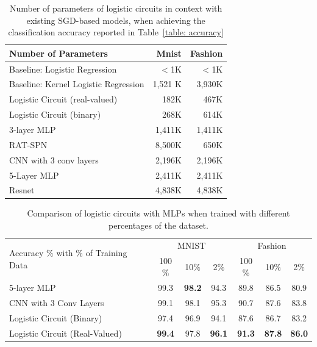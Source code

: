 \documentclass[letterpaper]{article} %
\begin{document}
\begin{table}[tb]
\centering
\begin{minipage}{0.48\textwidth}
{\footnotesize
\caption{Number of parameters of logistic circuits in context with existing SGD-based models, when achieving the classification accuracy reported in Table~\ref{table: accuracy}
}
\label{table: size}
\centering
{\fontsize{8.3}{9}\selectfont
\begin{sc}
\begin{tabular}{ @{}l r r @{} }
\toprule
Number of Parameters & Mnist & Fashion \\
\midrule\midrule
Baseline: Logistic Regression & $<$1K & $<$1K \\
Baseline: Kernel Logistic Regression & 1,521 K & 3,930K\\
\midrule
Logistic Circuit (real-valued) & 182K & 467K\\
Logistic Circuit (binary) & 268K & 614K \\
\midrule
3-layer MLP  & 1,411K  & 1,411K \\
RAT-SPN~ \cite{rat-spn2018} 	 & 8,500K & 650K \\
CNN with 3 conv layers  & 2,196K & 2,196K\\
5-Layer MLP & 2,411K &  2,411K \\
Resnet \cite{he2016cvpr} & 4,838K & 4,838K \\
\bottomrule
\end{tabular}
\end{sc}
}}
\end{minipage}
\end{table}

\begin{table}[tb]
\caption{Comparison of logistic circuits with MLPs when trained with different percentages of the dataset.}
\label{table: data efficiency}
\centering
{\fontsize{9}{9}\selectfont
\begin{sc}
\begin{tabular}{ @{}l c c c c c c@{} }
\toprule
\multirow{2}{*}{Accuracy $\%$  with $\%$ of Training Data }& \multicolumn{3}{c}{MNIST} & \multicolumn{3}{c}{Fashion}\\
\cmidrule{2-4} \cmidrule{5-7}
&100$\%$ & 10$\%$ & 2$\%$ & 100$\%$ & 10$\%$ & 2$\%$ \\
\midrule\midrule
5-layer MLP & 99.3 & {\bf 98.2} &  94.3   & 89.8 & 86.5 & 80.9 \\
CNN with 3 Conv Layers & 99.1 & 98.1 & 95.3 &90.7 & 87.6 & 83.8  \\
\midrule
Logistic Circuit (Binary) &  97.4 & 96.9 &  94.1 & 87.6 & 86.7 & 83.2 \\
Logistic Circuit (Real-Valued) &  {\bf 99.4} & 97.8 &  {\bf 96.1} & {\bf 91.3} & {\bf 87.8} & {\bf 86.0} \\
\bottomrule
\end{tabular}
\end{sc}
}
\end{table}
\end{document}
